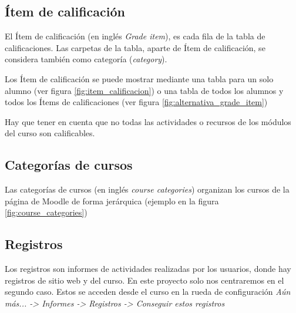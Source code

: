 \subsection{Ítem de calificación}
El Ítem de calificación\cite{noauthor_grade_nodate} (en inglés \textit{Grade item}), es cada fila de la tabla de calificaciones.
Las carpetas de la tabla, aparte de Ítem de calificación, se considera también como categoría (\textit{category}).

Los Ítem de calificación se puede mostrar mediante una tabla para un solo alumno (ver figura \ref{fig:item_calificacion}) o una tabla de todos los alumnos y todos los Ítems de calificaciones (ver figura \ref{fig:alternativa_grade_item})

Hay que tener en cuenta que no todas las actividades o recursos de los módulos del curso son calificables.


\subsection{Categorías de cursos}
Las categorías de cursos\cite{noauthor_course_nodate-1} (en inglés \textit{course categories}) organizan los cursos de la página de Moodle de forma jerárquica (ejemplo en la figura \ref{fig:course_categories})

\subsection{Registros}
Los registros son informes de actividades realizadas por los usuarios, donde hay registros de sitio web y del curso. En este proyecto solo nos centraremos en el segundo caso. Estos se acceden desde el curso en la rueda de configuración \textit{Aún más... ->  Informes ->  Registros -> Conseguir estos registros}


